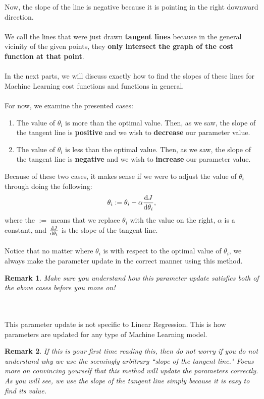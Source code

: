 \documentclass{article}
\newtheorem*{remark}{Remark}
\begin{document}
Now, the slope of the line is negative because it is pointing in the right downward direction. 
\\
\\
We call the lines that were just drawn \textbf{tangent lines} because in the general vicinity of the given points, they \textbf{only intersect the graph of the cost function at that point}. 
\\
\\
In the next parts, we will discuss exactly how to find the slopes of these lines for Machine Learning cost functions and functions in general. 
\\
\\
For now, we examine the presented cases:
\begin{enumerate}
    \item The value of $\theta_i$ is more than the optimal value. Then, as we saw, the slope of the tangent line is \textbf{positive} and we wish to \textbf{decrease} our parameter value. 
    \item The value of $\theta_i$ is less than the optimal value. Then, as we saw, the slope of the tangent line is \textbf{negative} and we wish to \textbf{increase} our parameter value.
\end{enumerate}
Because of these two cases, it makes sense if we were to adjust the value of $\theta_i$ through doing the following: 
\[\theta_i:=\theta_i-\alpha\diff{J}{\theta_i},\]
where the $:=$ means that we replace $\theta_i$ with the value on the right, $\alpha$ is a constant, and $\diff{J}{\theta_i}$ is the slope of the tangent line. 
\\
\\
Notice that no matter where $\theta_i$ is with respect to the optimal value of $\theta_i$, we always make the parameter update in the correct manner using this method.
\begin{remark}
Make sure you understand how this parameter update satisfies both of the above cases before you move on!
\end{remark}
\\
\\
This parameter update is not specific to Linear Regression. This is how parameters are updated for any type of Machine Learning model. 
\begin{remark}
If this is your first time reading this, then do not worry if you do not understand why we use the seemingly arbitrary ``slope of the tangent line." Focus more on convincing yourself that this method will update the parameters correctly. As you will see, we use the slope of the tangent line simply because it is easy to find its value.
\end{remark}
\end{document}
